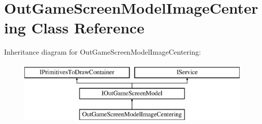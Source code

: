 \hypertarget{classOutGameScreenModelImageCentering}{}\section{Out\+Game\+Screen\+Model\+Image\+Centering Class Reference}
\label{classOutGameScreenModelImageCentering}
Inheritance diagram for Out\+Game\+Screen\+Model\+Image\+Centering\+:\begin{figure}[H]
\begin{center}
\leavevmode
\includegraphics[height=3.000000cm]{classOutGameScreenModelImageCentering}
\end{center}
\end{figure}
